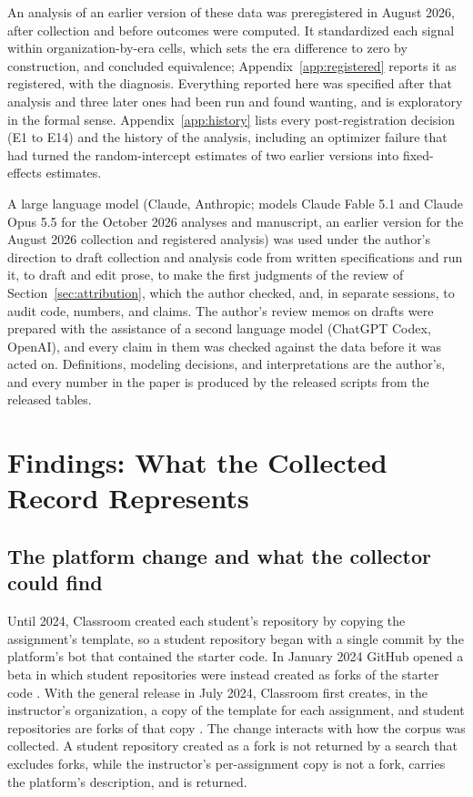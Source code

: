 \documentclass[acmsmall,screen,review,anonymous]{acmart}
\begin{document}
An analysis of an earlier version of these data was preregistered in August 2026, after collection and before outcomes were computed. It standardized each signal within organization-by-era cells, which sets the era difference to zero by construction, and concluded equivalence; Appendix~\ref{app:registered} reports it as registered, with the diagnosis. Everything reported here was specified after that analysis and three later ones had been run and found wanting, and is exploratory in the formal sense. Appendix~\ref{app:history} lists every post-registration decision (E1 to E14) and the history of the analysis, including an optimizer failure that had turned the random-intercept estimates of two earlier versions into fixed-effects estimates.

A large language model (Claude, Anthropic; models Claude Fable 5.1 and Claude Opus 5.5 for the October 2026 analyses and manuscript, an earlier version for the August 2026 collection and registered analysis) was used under the author's direction to draft collection and analysis code from written specifications and run it, to draft and edit prose, to make the first judgments of the review of Section~\ref{sec:attribution}, which the author checked, and, in separate sessions, to audit code, numbers, and claims. The author's review memos on drafts were prepared with the assistance of a second language model (ChatGPT Codex, OpenAI), and every claim in them was checked against the data before it was acted on. Definitions, modeling decisions, and interpretations are the author's, and every number in the paper is produced by the released scripts from the released tables.

\section{Findings: What the Collected Record Represents}
\label{sec:record}

\subsection{The platform change and what the collector could find}
\label{sec:platform}

Until 2024, Classroom created each student's repository by copying the assignment's template, so a student repository began with a single commit by the platform's bot that contained the starter code. In January 2024 GitHub opened a beta in which student repositories were instead created as forks of the starter code \citep{github2023classroomchanges, github2024forksbeta}. With the general release in July 2024, Classroom first creates, in the instructor's organization, a copy of the template for each assignment, and student repositories are forks of that copy \citep{github2024forksga, githubdocs2026template}. The change interacts with how the corpus was collected. A student repository created as a fork is not returned by a search that excludes forks, while the instructor's per-assignment copy is not a fork, carries the platform's description, and is returned.
\end{document}
